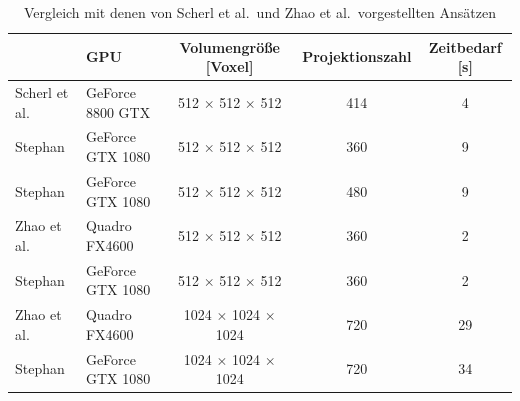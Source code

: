 \begin{table}
    \centering
    \begin{tabular}{llccc}
        \hline
        & GPU & Volumengröße [Voxel] & Projektionszahl & Zeitbedarf [s]\\
        \hline
        Scherl et al. & GeForce 8800 GTX & 512 $\times$ 512 $\times$ 512 & 414 & 4\\
        Stephan & GeForce GTX 1080 & 512 $\times$ 512 $\times$ 512 & 360 & 9\\
        Stephan & GeForce GTX 1080 & 512 $\times$ 512 $\times$ 512 & 480 & 9\\
        \hline
        Zhao et al. & Quadro FX4600 & 512 $\times$ 512 $\times$ 512 & 360 & 2\\
        Stephan & GeForce GTX 1080 & 512 $\times$ 512 $\times$ 512 & 360 & 2\\
        Zhao et al. & Quadro FX4600 & 1024 $\times$ 1024 $\times$ 1024 & 720 & 29\\
        Stephan & GeForce GTX 1080 & 1024 $\times$ 1024 $\times$ 1024 & 720 & 34\\
        \hline
    \end{tabular}
    \caption{Vergleich mit denen von Scherl et al.\ und Zhao et al.\ vorgestellten Ansätzen}
    \label{table:paris_vs_scherl_zhao}
\end{table}
